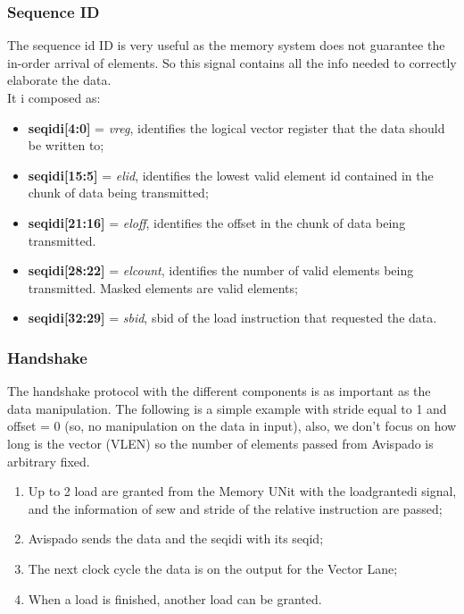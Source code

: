 \subsubsection{Sequence ID}
The sequence id ID is very useful as the memory system does not guarantee the in-order arrival of elements. So this signal contains all the info needed to correctly elaborate the data.\\

It i composed as:
\begin{itemize}
    \item \textbf{seq\+id\+i[4:0]} = \textit{v\+reg}, identifies the logical vector register that the data should be written to;
    
    \item \textbf{seq\+id\+i[15:5]} = \textit{el\+id}, identifies the lowest valid element id contained in the chunk of data being transmitted;
    
    \item \textbf{seq\+id\+i[21:16]} = \textit{el\+off}, identifies the offset in the chunk of data being transmitted.
    
    \item \textbf{seq\+id\+i[28:22]} = \textit{el\+count}, identifies the number of valid elements being transmitted. Masked elements are valid elements; 
    
    \item \textbf{seq\+id\+i[32:29]} = \textit{sb\+id}, sb\+id of the load instruction that requested the data.
\end{itemize}


\subsubsection{Handshake}
The handshake protocol with the different components is as important as the data manipulation. The following is a simple example with stride equal to 1 and offset = 0 (so, no manipulation on the data in input), also, we don't focus on how long is the vector (VLEN) so the number of elements passed from Avispado is arbitrary fixed.

\begin{enumerate}
    \item Up to 2 load are granted from the Memory UNit with the load\+granted\+i signal, and the information of sew and stride of the relative instruction are passed;
    
    \item Avispado sends the data and the seq\+id\+i with its seq\+id;
    
    \item The next clock cycle the data is on the output for the Vector Lane;
    
    \item When a load is finished, another load can be granted.
\end{enumerate}

